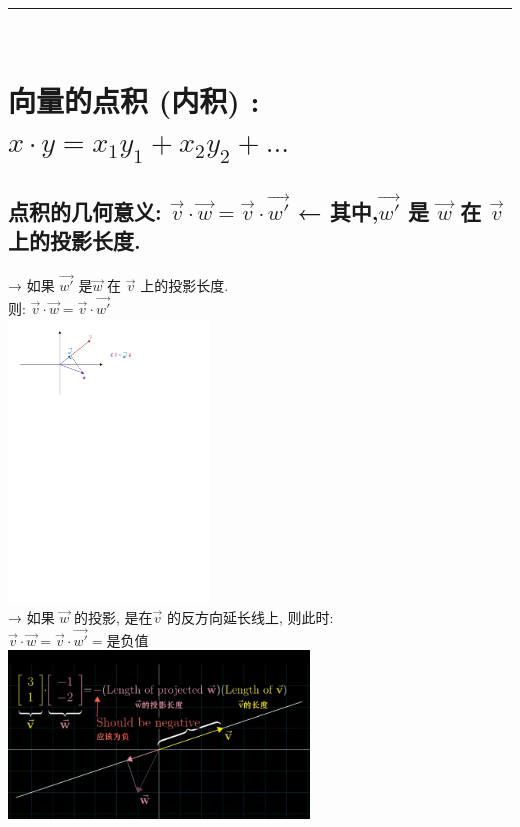 \documentclass[UTF8]{ctexart}
\begin{document}
~\\
\hrule
~\\


\section{向量的点积 (内积) : $x \cdot y = x_{1} y_{1} + x_{2} y_{2} + ...$}

\subsection{点积的几何意义: $\vec{v} \cdot \vec{w} = \vec{v} \cdot \vec{w'}$ ← 其中,$\vec{w'}$ 是 $\vec{w}$ 在 $\vec{v}$ 上的投影长度. }

→ 如果 $\vec{w'}$ 是$\vec{w}$ 在 $\vec{v}$ 上的投影长度.\\
则:  $\vec{v} \cdot \vec{w} = \vec{v} \cdot \vec{w'}$\\
\includegraphics[width=0.4\textwidth]{img/0091.pdf}\\


→ 如果 $\vec{w}$ 的投影, 是在$\vec{v}$ 的反方向延长线上, 则此时:\\
$\vec{v} \cdot \vec{w} = \vec{v} \cdot \vec{w'} = \text{是负值}$\\
\includegraphics[width=0.6\textwidth]{img/0092.png}\\
\end{document}
